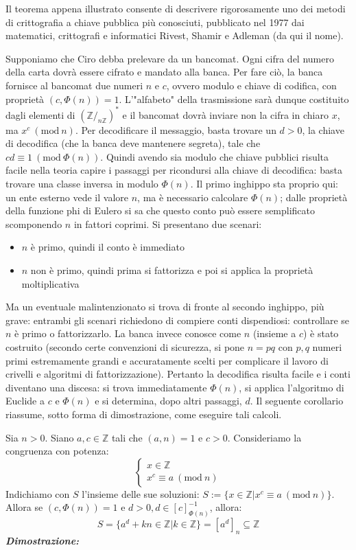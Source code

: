 \documentclass[oneside]{book}
\theoremstyle{remark}
\newcommand{\Mod}[1]{\ (\mathrm{mod}\ #1)} %
\begin{document}
Il teorema appena illustrato consente di descrivere rigorosamente uno
dei metodi di crittografia a chiave pubblica più conosciuti, pubblicato nel
1977 dai matematici, crittografi e informatici Rivest, Shamir e Adleman
(da qui il nome).

Supponiamo che Ciro debba prelevare da un bancomat. Ogni cifra del numero
della carta dovrà essere cifrato e mandato alla banca. Per fare ciò, la
banca fornisce al bancomat due numeri $n$ e $c$, ovvero modulo e chiave
di codifica, con proprietà $(c, \Phi(n)) = 1$. L'"alfabeto" della trasmissione
sarà dunque costituito dagli elementi di $(\mathbb{Z}/_{n\mathbb{Z}})^*$
e il bancomat dovrà inviare non la cifra in chiaro $x$, ma $x^c \Mod{n}$.
Per decodificare il messaggio, basta trovare un $d>0$, la chiave di decodifica
(che la banca deve mantenere segreta),
tale che $cd \equiv 1 \Mod{\Phi(n)}$. Quindi avendo sia modulo che chiave
pubblici risulta facile nella teoria capire i passaggi per ricondursi alla
chiave di decodifica: basta trovare una classe inversa in modulo $\Phi(n)$.
Il primo inghippo sta proprio qui: un ente esterno vede il valore $n$, ma è
necessario calcolare $\Phi(n)$; dalle proprietà della funzione phi di
Eulero si sa che questo conto può essere semplificato scomponendo $n$ in
fattori coprimi. Si presentano due scenari:
\begin{itemize}
\item $n$ è primo, quindi il conto è immediato
\item $n$ non è primo, quindi prima si fattorizza e poi si applica la proprietà moltiplicativa
\end{itemize}
Ma un eventuale malintenzionato si trova di fronte al secondo inghippo, più
grave: entrambi gli scenari richiedono di compiere conti dispendiosi:
controllare se $n$ è primo o fattorizzarlo. La banca invece conosce come
$n$ (insieme a $c$) è stato costruito (secondo certe convenzioni di sicurezza,
si pone $n=pq$ con $p,q$ numeri primi estremamente grandi e accuratamente scelti per
complicare il lavoro di crivelli e algoritmi di fattorizzazione).
Pertanto la decodifica risulta facile e i conti diventano una discesa: si trova
immediatamente $\Phi(n)$, si applica l'algoritmo di Euclide a $c$ e $\Phi(n)$ e
si determina, dopo altri passaggi, $d$. Il seguente corollario riassume, sotto
forma di dimostrazione, come eseguire tali calcoli.

\begin{tcolorbox}[colback=green!30, colframe=green!30!black, title={Decodifica con Metodo RSA}]
Sia $n>0$. Siano $a,c \in \mathbb{Z}$ tali che $(a,n)=1$ e $c>0$.
Consideriamo la congruenza con potenza:
\[ \begin{cases}
    x \in \mathbb{Z}\\
    x^c \equiv a \Mod{n}
\end{cases} \]
Indichiamo con $S$ l'insieme delle sue soluzioni: $S:=\{x\in \mathbb{Z}|
x^c \equiv a \Mod{n} \}$. Allora se $(c,\Phi(n))=1$ e $d>0,d\in[c]^{-1}_{\Phi(n)}$,
allora: \[ S= \{a^d + kn \in \mathbb{Z}|k\in\mathbb{Z}\} = [a^d]_n \subseteq \mathbb{Z} \]
\textit{\textbf{Dimostrazione:}}
\end{tcolorbox}
\end{document}
